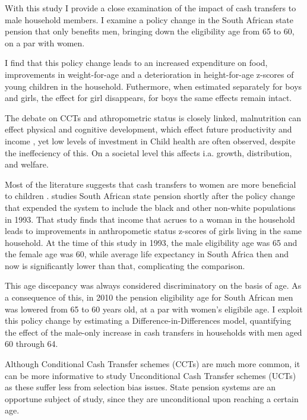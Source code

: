 \documentclass[a4paper,british]{article}\usepackage[]{graphicx}\usepackage[]{color}
\begin{document}
With this study I provide a close examination of the impact of cash
transfers to male household members. I examine a policy change in
the South African state pension that only benefits men, bringing down
the eligibility age from 65 to 60, on a par with women.

I find that this policy change leads to an increased expenditure on
food, improvements in weight-for-age and a deterioration in height-for-age
z-scores of young children in the household. Futhermore, when estimated
separately for boys and girls, the effect for girl disappears, for
boys the same effects remain intact.

The debate on CCTs and athropometric status is closely linked, malnutrition
can effect physical and cognitive development, which effect future
productivity and income , yet low levels of investment in Child health
are often observed, despite the ineffeciency of this. On a societal
level this affects i.a. growth, distribution, and welfare.

Most of the literature suggests that cash transfers to women are more
beneficial to children \citep{thomas1994like} . \citet{duflo2000child,duflo2003grandmothers}
studies South African state pension shortly after the policy change
that expended the system to include the black and other non-white
populations in 1993. That study finds that income that acrues to a
woman in the household leads to improvements in anthropometic status
z-scores of girls living in the same household. At the time of this
study in 1993, the male eligibility age was 65 and the female age
was 60, while average life expectancy in South Africa then and now
is significantly lower than that, complicating the comparison. 

This age discepancy was always considered discriminatory on the basis
of age. As a consequence of this, in 2010 the pension eligibility
age for South African men was lowered from 65 to 60 years old, at
a par with women's eligibile age. I exploit this policy change by
estimating a Difference-in-Differences model, quantifying the effect
of the male-only increase in cash transfers in households with men
aged 60 through 64.

Although Conditional Cash Transfer schemes (CCTs) are much more common,
it can be more informative to study Unconditional Cash Transfer schemes
(UCTs) as these suffer less from selection bias issues. State pension
systems are an opportune subject of study, since they are unconditional
upon reaching a certain age. 
\end{document}
